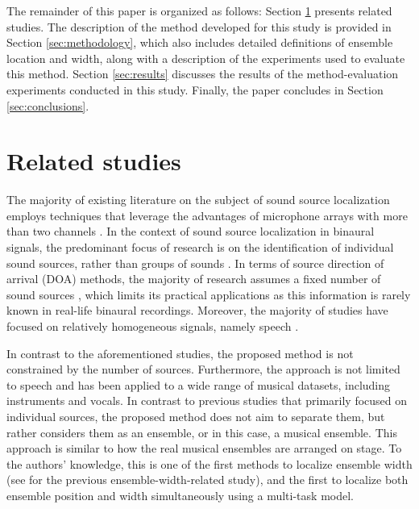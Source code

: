 \documentclass{article}
\begin{document}
The remainder of this paper is organized as follows: Section \ref{sec:related-studies} presents related studies. The description of the method developed for this study is provided in Section \ref{sec:methodology}, which also includes detailed definitions of ensemble location and width, along with a description of the experiments used to evaluate this method. Section \ref{sec:results} discusses the results of the method-evaluation experiments conducted in this study. Finally, the paper concludes in Section \ref{sec:conclusions}.

\section{Related studies}
\label{sec:related-studies}

The majority of existing literature on the subject of sound source localization employs techniques that leverage the advantages of microphone arrays with more than two channels \cite{kaveh_statistical_1986, pavlidi_real-time_2012, pan_multi-tone_2021, hahmann_sound_2022, chung_sound_2022, liu_sound_2022}. In the context of sound source localization in binaural signals, the predominant focus of research is on the identification of individual sound sources, rather than groups of sounds \cite{dietz_auditory_2011, may_probabilistic_2011, may_binaural_2012, woodruff_binaural_2012, may_robust_2015, ma16c_interspeech, ma_exploiting_2017, benaroya_binaural_2018}. In terms of source direction of arrival (DOA) methods, the majority of research assumes a fixed number of sound sources \cite{pang_multitask_2019, vecchiotti19, ma_exploiting_2017, woodruff_binaural_2012, s_spatiogram_2021}, which limits its practical applications as this information is rarely known in real-life binaural recordings. Moreover, the majority of studies have focused on relatively homogeneous signals, namely speech \cite{dietz_auditory_2011, may_probabilistic_2011, may_binaural_2012, woodruff_binaural_2012, may_robust_2015, ma16c_interspeech, ma_exploiting_2017, benaroya_binaural_2018, wang_binaural_2020, liu_multiple_2018, yang_deepear_2022, ma_robust_2018}.

In contrast to the aforementioned studies, the proposed method is not constrained by the number of sources. Furthermore, the approach is not limited to speech and has been applied to a wide range of musical datasets, including instruments and vocals. In contrast to previous studies that primarily focused on individual sources, the proposed method does not aim to separate them, but rather considers them as an ensemble, or in this case, a musical ensemble. This approach is similar to how the real musical ensembles are arranged on stage. To the authors' knowledge, this is one of the first methods to localize ensemble width (see \cite{antoniuk2023blind} for the previous ensemble-width-related study), and the first to localize both ensemble position and width simultaneously using a multi-task model.
\end{document}
